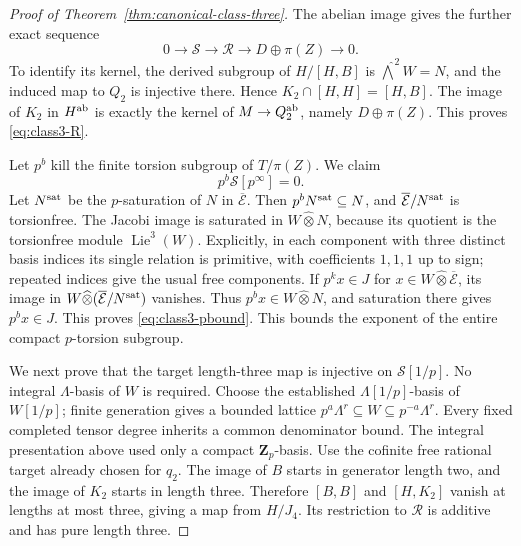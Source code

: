 \documentclass[11pt]{article}
\theoremstyle{definition}\newtheorem{definition}[theorem]{Definition}
\begin{document}
\begin{proof}[Proof of Theorem~\ref{thm:canonical-class-three}]
The abelian image gives the further exact sequence
\begin{equation}\label{eq:class3-R}
 0\longrightarrow \mathcal S\longrightarrow \mathcal R
 \longrightarrow D\oplus\pi(Z)\longrightarrow0.
\end{equation}
To identify its kernel, the derived subgroup of
\(H/[H,B]\) is \(\widehat{\bigwedge}^2W=N\), and the induced
map to \(Q_2\) is injective there. Hence
\(K_2\cap[H,H]=[H,B]\).
The image of \(K_2\) in \(H^{\rm ab}\) is exactly the
kernel of \(M\to Q_2^{\rm ab}\), namely \(D\oplus\pi(Z)\).
This proves \eqref{eq:class3-R}.

Let \(p^b\) kill the finite torsion subgroup of \(T/\pi(Z)\).
We claim
\begin{equation}\label{eq:class3-pbound}
                         p^b\mathcal S[p^\infty]=0.
\end{equation}
Let \(N^{\rm sat}\) be the \(p\)-saturation of \(N\) in
\(\overline{\mathcal E}\). Then \(p^bN^{\rm sat}\subseteq N\), and
\(\overline{\mathcal E}/N^{\rm sat}\) is torsionfree.
The Jacobi image is saturated in \(W\widehat\otimes N\),
because its quotient is the torsionfree module
\(\operatorname{Lie}^3(W)\). Explicitly, in each component
with three distinct basis indices its single relation is
primitive, with coefficients \(1,1,1\) up to sign; repeated
indices give the usual free components.
If \(p^kx\in J\) for \(x\in W\widehat\otimes\overline{\mathcal E}\), its
image in \(W\widehat\otimes(\overline{\mathcal E}/N^{\rm sat})\) vanishes.
Thus \(p^bx\in W\widehat\otimes N\), and saturation there
gives \(p^bx\in J\). This proves \eqref{eq:class3-pbound}.
This bounds the exponent of the entire compact $p$-torsion subgroup.

We next prove that the target length-three map is
injective on \(\mathcal S[1/p]\).
No integral \(\Lambda\)-basis of \(W\) is required.
Choose the established \(\Lambda[1/p]\)-basis of
\(W[1/p]\); finite generation gives a bounded lattice
\(p^a\Lambda^r\subseteq W\subseteq p^{-a}\Lambda^r\).
Every fixed completed tensor degree inherits a common
denominator bound. The integral presentation above used
only a compact \(\mathbf Z_p\)-basis.
Use the cofinite free rational target already chosen for
\(q_2\). The image of \(B\) starts in generator length two,
and the image of \(K_2\) starts in length three.
Therefore \([B,B]\) and \([H,K_2]\) vanish at lengths at
most three, giving a map from \(H/J_4\).
Its restriction to \(\mathcal R\) is additive and has pure length
three.


\end{proof}
\end{document}
